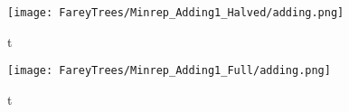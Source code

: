 %
%
%
%
%

\begin{figure}
    \centering
    \texttt{[image: FareyTrees/Minrep\_Adding1\_Halved/adding.png]}
    \caption{t}
    \label{fig:tree.adding1.hor.halved}
\end{figure}

\begin{figure}
    \centering
    \texttt{[image: FareyTrees/Minrep\_Adding1\_Full/adding.png]}
    \caption{t}
    \label{fig:tree.adding1.hor.full}
\end{figure}